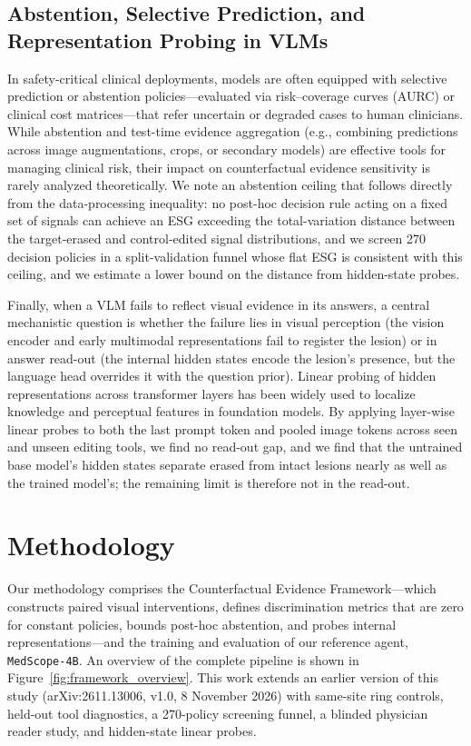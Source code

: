 \documentclass[5p,times,twocolumn,authoryear]{elsarticle}
\begin{document}
\subsection{Abstention, Selective Prediction, and Representation Probing in VLMs}
\label{subsec:rw_abstention}
In safety-critical clinical deployments, models are often equipped with selective prediction or abstention policies---evaluated via risk--coverage curves (AURC) \citep{geifman2017selective} or clinical cost matrices---that refer uncertain or degraded cases to human clinicians. While abstention and test-time evidence aggregation (e.g., combining predictions across image augmentations, crops, or secondary models) are effective tools for managing clinical risk, their impact on counterfactual evidence sensitivity is rarely analyzed theoretically. We note an abstention ceiling that follows directly from the data-processing inequality: no post-hoc decision rule acting on a fixed set of signals can achieve an ESG exceeding the total-variation distance between the target-erased and control-edited signal distributions, and we screen 270 decision policies in a split-validation funnel whose flat ESG is consistent with this ceiling, and we estimate a lower bound on the distance from hidden-state probes.

Finally, when a VLM fails to reflect visual evidence in its answers, a central mechanistic question is whether the failure lies in visual perception (the vision encoder and early multimodal representations fail to register the lesion) or in answer read-out (the internal hidden states encode the lesion's presence, but the language head overrides it with the question prior). Linear probing of hidden representations across transformer layers \citep{alain2016understanding} has been widely used to localize knowledge and perceptual features in foundation models. By applying layer-wise linear probes to both the last prompt token and pooled image tokens across seen and unseen editing tools, we find no read-out gap, and we find that the untrained base model's hidden states separate erased from intact lesions nearly as well as the trained model's; the remaining limit is therefore not in the read-out.

\section{Methodology}
\label{sec:method}
Our methodology comprises the Counterfactual Evidence Framework---which constructs paired visual interventions, defines discrimination metrics that are zero for constant policies, bounds post-hoc abstention, and probes internal representations---and the training and evaluation of our reference agent, \texttt{MedScope-4B}. An overview of the complete pipeline is shown in Figure~\ref{fig:framework_overview}. This work extends an earlier version of this study \citep{gurram2026medscope} (arXiv:2611.13006, v1.0, 8 November 2026) with same-site ring controls, held-out tool diagnostics, a 270-policy screening funnel, a blinded physician reader study, and hidden-state linear probes.
\end{document}
